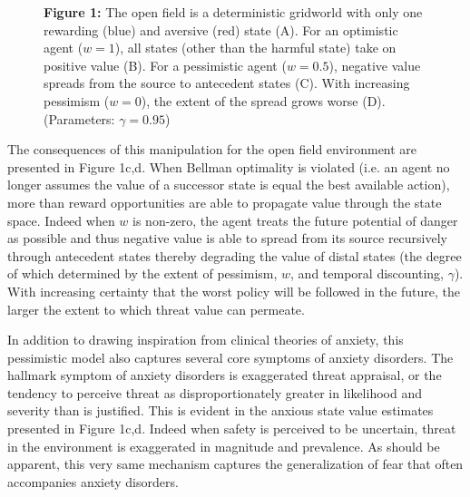 \documentclass[11pt]{article} %
\begin{document}
\begin{figure}
  \centerline{%
  }
  \par \textbf{Figure 1:} The open field is a deterministic gridworld with only one rewarding (blue) and aversive (red) state (A). For an optimistic agent ($w=1$), all states (other than the harmful state) take on positive value (B). For a pessimistic agent ($w=0.5$), negative value spreads from the source to antecedent states (C). With increasing pessimism ($w=0$), the extent of the spread grows worse (D). (Parameters: $\gamma = 0.95$)
\end{figure}

The consequences of this manipulation for the open field environment are presented in Figure 1c,d. When Bellman optimality is violated (i.e. an agent no longer assumes the value of a successor state is equal the best available action), more than reward opportunities are able to propagate value through the state space. Indeed when $w$ is non-zero, the agent treats the future potential of danger as possible and thus negative value is able to spread from its source recursively through antecedent states thereby degrading the value of distal states (the degree of which determined by the extent of pessimism, $w$, and temporal discounting, $\gamma$). With increasing certainty that the worst policy will be followed in the future, the larger the extent to which threat value can permeate.

In addition to drawing inspiration from clinical theories of anxiety, this pessimistic model also captures several core symptoms of anxiety disorders. The hallmark symptom of anxiety disorders is exaggerated threat appraisal, or the tendency to perceive threat as disproportionately greater in likelihood and severity than is justified. This is evident in the anxious state value estimates presented in Figure 1c,d. Indeed when safety is perceived to be uncertain, threat in the environment is exaggerated in magnitude and prevalence. As should be apparent, this very same mechanism captures the generalization of fear that often accompanies anxiety disorders.
\end{document}
